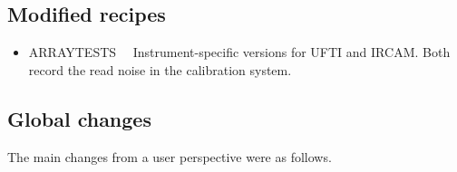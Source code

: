 \documentclass[twoside,11pt]{article}
\newcommand{\htmlref}[2]{#1}
\renewcommand{\_}{\texttt{\symbol{95}}}
\begin{document}
\subsection{Modified recipes}

\begin{itemize}
    \item \htmlref{ARRAY\_TESTS}{ARRAY\_TESTS}~~
       Instrument-specific versions for UFTI and IRCAM.  Both record the
       read noise in the calibration system.
\end{itemize}

\subsection{Global changes}

The main changes from a user perspective were as follows.
\end{document}
